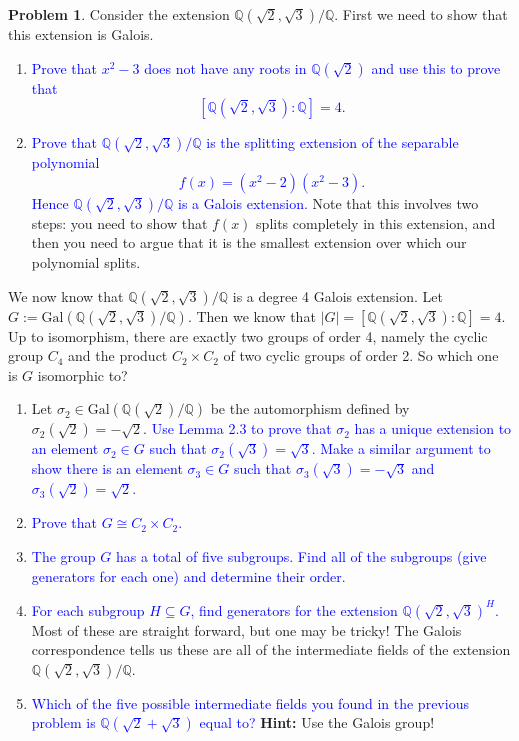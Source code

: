 \documentclass[11pt]{article}
\def\QQ{\mathbb{Q}}
\def\gal{\mathrm{Gal}}
\theoremstyle{definition}
\newtheorem{problem}{Problem}[section]
\numberwithin{equation}{subsection}
\newcommand{\blue}[1]{\textcolor{blue}{#1}}
\begin{document}
\begin{problem}
    Consider the extension $\QQ(\sqrt{2}, \sqrt{3})/\QQ$.
    First we need to show that this extension is Galois.
    \begin{enumerate}
        \item \blue{Prove that $x^2 - 3$ does not have any roots in $\QQ(\sqrt{2})$ and use this to prove that 
        \[
            [\QQ(\sqrt{2},\sqrt{3}) : \QQ] = 4.
        \]
        }

        \item \blue{Prove that $\QQ(\sqrt{2}, \sqrt{3})/\QQ$ is the splitting extension of the separable polynomial 
        \[
            f(x) = (x^2 - 2)(x^2 - 3).
        \]
        Hence $\QQ(\sqrt{2}, \sqrt{3})/\QQ$ is a Galois extension.
        }
        Note that this involves two steps: you need to show that $f(x)$ splits completely in this extension, and then you need to argue that it is the smallest extension over which our polynomial splits.
    \end{enumerate}

    We now know that $\QQ(\sqrt{2}, \sqrt{3})/\QQ$ is a degree 4 Galois extension.
    Let $G := \gal(\QQ(\sqrt{2}, \sqrt{3})/\QQ)$.
    Then we know that $|G| = [\QQ(\sqrt{2}, \sqrt{3}):\QQ] = 4$.
    Up to isomorphism, there are exactly two groups of order 4, namely the cyclic group $C_4$ and the product $C_2 \times C_2$ of two cyclic groups of order 2.
    So which one is $G$ isomorphic to?

    \begin{enumerate}
        \item[3.] Let $\sigma_2 \in \gal(\QQ(\sqrt{2})/\QQ)$ be the automorphism defined by $\sigma_2(\sqrt{2}) = -\sqrt{2}$.
        \blue{Use Lemma 2.3 to prove that $\sigma_2$ has a unique extension to an element $\sigma_2 \in G$ such that $\sigma_2(\sqrt{3}) = \sqrt{3}$.
        Make a similar argument to show there is an element $\sigma_3 \in G$ such that $\sigma_3(\sqrt{3}) = -\sqrt{3}$ and $\sigma_3(\sqrt{2}) = \sqrt{2}$.
        }

        \item[4.]
        \blue{Prove that $G \cong C_2 \times C_2$.}

        \item[5.]
        \blue{The group $G$ has a total of five subgroups.
        Find all of the subgroups (give generators for each one) and determine their order.}

        \item[6.]
        \blue{For each subgroup $H \subseteq G$, find generators for the extension $\QQ(\sqrt{2},\sqrt{3})^H$.
        }
        Most of these are straight forward, but one may be tricky!
        The Galois correspondence tells us these are all of the intermediate fields of the extension $\QQ(\sqrt{2},\sqrt{3})/\QQ$.

        \item[7.]
        \blue{Which of the five possible intermediate fields you found in the previous problem is $\QQ(\sqrt{2} + \sqrt{3})$ equal to?} \textbf{Hint: }Use the Galois group!
    \end{enumerate}
\end{problem}
\end{document}
